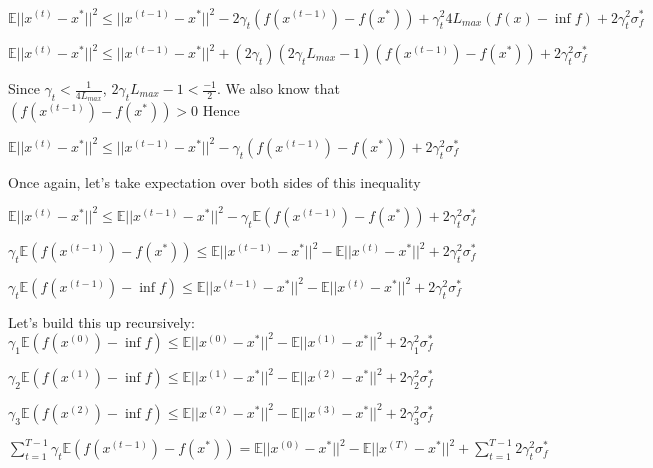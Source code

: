 $\mathbb{E}||x^{(t)} - x^*||^2 \leq ||x^{(t - 1)} - x^*||^2 - 2\gamma_t (f(x^{(t - 1)}) - f(x^*)) + \gamma_t^2 4L_{max} (f(x) - \inf f) + 2\gamma_t^2 \sigma_f^* $ \newline 

$\mathbb{E}||x^{(t)} - x^*||^2 \leq ||x^{(t - 1)} - x^*||^2 + (2 \gamma_t) (2 \gamma_t L_{max} - 1)(f(x^{(t - 1)}) - f(x^*)) + 2\gamma_t^2 \sigma_f^* $ \newline 

Since $\gamma_t < \frac{1}{4L_{max}}$, $2\gamma_t L_{max} - 1 < \frac{-1}{2}$. We also know that $(f(x^{(t - 1)}) - f(x^*)) > 0$ Hence \newline 

$\mathbb{E}||x^{(t)} - x^*||^2 \leq ||x^{(t - 1)} - x^*||^2 - \gamma_t (f(x^{(t - 1)}) - f(x^*)) + 2\gamma_t^2 \sigma_f^* $ \newline 

Once again, let's take expectation over both sides of this inequality \newline 

$\mathbb{E}||x^{(t)} - x^*||^2 \leq \mathbb{E} ||x^{(t - 1)} - x^*||^2 - \gamma_t \mathbb{E} (f(x^{(t - 1)}) - f(x^*)) + 2\gamma_t^2 \sigma_f^* $ \newline 

$\gamma_t \mathbb{E} (f(x^{(t - 1)}) - f(x^*)) \leq \mathbb{E} ||x^{(t - 1)} - x^*||^2 - \mathbb{E}||x^{(t)} - x^*||^2 + 2\gamma_t^2 \sigma_f^* $ \newline 

$\gamma_t \mathbb{E} (f(x^{(t - 1)}) - \inf f) \leq \mathbb{E} ||x^{(t - 1)} - x^*||^2 - \mathbb{E}||x^{(t)} - x^*||^2 + 2\gamma_t^2 \sigma_f^* $ \newline 

Let's build this up recursively: \newline 
$\gamma_1 \mathbb{E} (f(x^{(0)}) - \inf f) \leq \mathbb{E} ||x^{(0)} - x^*||^2 - \mathbb{E}||x^{(1)} - x^*||^2 + 2\gamma_1^2 \sigma_f^* $ \newline 


$\gamma_2 \mathbb{E} (f(x^{(1)}) - \inf f) \leq \mathbb{E} ||x^{(1)} - x^*||^2 - \mathbb{E}||x^{(2)} - x^*||^2 + 2\gamma_2^2 \sigma_f^* $ \newline 

$\gamma_3 \mathbb{E} (f(x^{(2)}) - \inf f) \leq \mathbb{E} ||x^{(2)} - x^*||^2 - \mathbb{E}||x^{(3)} - x^*||^2 + 2\gamma_3^2 \sigma_f^* $ \newline 

$\sum_{t=1}^{T - 1} \gamma_t \mathbb{E} (f(x^{(t - 1)}) - f(x^*)) = \mathbb{E} ||x^{(0)} - x^*||^2 - \mathbb{E}||x^{(T)} - x^*||^2 +  \sum_{t=1}^{T - 1} 2 \gamma_t^2 \sigma_f^*$

